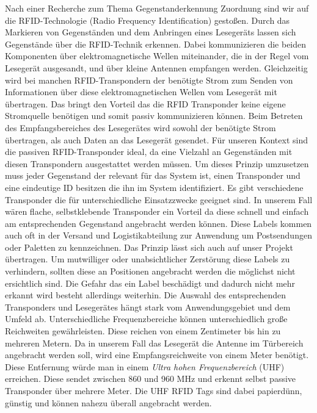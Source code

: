 Nach einer Recherche zum Thema Gegenstanderkennung \bzw Zuordnung sind wir auf
die RFID-Technologie (Radio Frequency Identification) gestoßen. Durch das
Markieren von Gegenständen und dem Anbringen eines Lesegeräts lassen sich
Gegenstände über die RFID-Technik erkennen. Dabei kommunizieren die beiden
Komponenten über elektromagnetische Wellen miteinander, die in der Regel vom
Lesegerät ausgesandt, und über kleine Antennen empfangen werden. Gleichzeitig
wird bei manchen RFID-Transpondern der benötigte Strom zum Senden von
Informationen über diese elektromagnetischen Wellen vom Lesegerät mit
übertragen. Das bringt den Vorteil das die RFID Transponder keine eigene
Stromquelle benötigen und somit passiv kommunizieren können. Beim Betreten des
Empfangsbereiches des Lesegerätes wird sowohl der benötigte Strom übertragen,
als auch Daten an das Lesegerät gesendet. Für unseren Kontext sind die passiven
RFID-Transponder ideal, da eine Vielzahl an Gegenständen mit diesen
Transpondern ausgestattet werden müssen.
Um dieses Prinzip umzusetzen muss jeder Gegenstand der relevant für das System
ist, einen Transponder und eine eindeutige ID besitzen die ihn im System
identifiziert. Es gibt verschiedene Transponder die für unterschiedliche
Einsatzzwecke geeignet sind. In unserem Fall wären flache, selbstklebende
Transponder ein Vorteil da diese schnell und einfach am entsprechenden
Gegenstand angebracht werden können. Diese Labels \citep{labels} 
kommen auch oft in der Versand und Logistikabteilung zur Anwendung um
Postsendungen oder Paletten zu kennzeichnen. Das Prinzip lässt sich auch auf
unser Projekt übertragen. Um mutwilliger oder unabsichtlicher Zerstörung diese
Labels zu verhindern, sollten diese an Positionen angebracht werden die
möglichst nicht ersichtlich sind. Die Gefahr das ein Label beschädigt und
dadurch nicht mehr erkannt wird besteht allerdings weiterhin.
Die Auswahl des entsprechenden Transponders und Lesegerätes hängt stark vom
Anwendungsgebiet und dem Umfeld ab. Unterschiedliche Frequenzbereiche können
unterschiedlich große Reichweiten gewährleisten. Diese reichen von einem
Zentimeter bis hin zu mehreren Metern. Da in unserem Fall das Lesegerät \bzw
die Antenne im Türbereich angebracht werden soll, wird eine Empfangsreichweite
von \ca einem Meter benötigt. Diese Entfernung würde man in einem
\textit{Ultra hohen Frequenzbereich} (UHF) erreichen. Diese sendet zwischen 
860 und 960 MHz \citep{[quelle](https://www.impinj.com/about-rfid/types-of-rfid-systems/)}
und erkennt selbst passive Transponder über mehrere Meter. Die UHF RFID Tags
sind dabei papierdünn, günstig und können nahezu überall angebracht werden.
